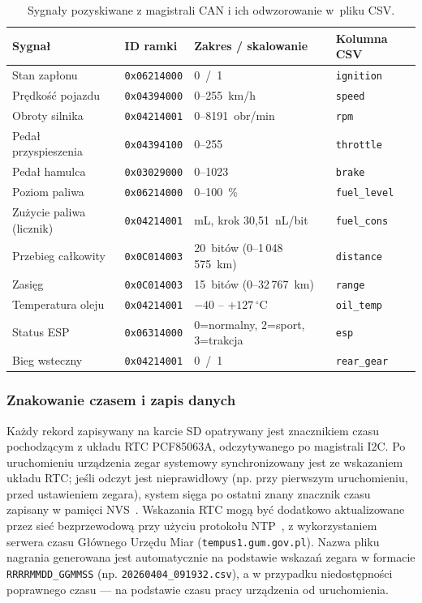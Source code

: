 \begin{table}[!h]
    \centering
    \caption{Sygnały pozyskiwane z magistrali CAN i ich odwzorowanie w~pliku CSV.}
    \label{tab:sygnaly-can}
    \begin{tabular}{| p{3.9cm} | p{2.5cm} | p{3.9cm} | p{2.2cm} |} \hline
        \textbf{Sygnał} & \textbf{ID ramki} & \textbf{Zakres / skalowanie} & \textbf{Kolumna CSV} \\ \hline\hline
        Stan zapłonu & \texttt{0x06214000} & 0~/~1 & \texttt{ignition} \\ \hline
        Prędkość pojazdu & \texttt{0x04394000} & 0--255~km/h & \texttt{speed} \\ \hline
        Obroty silnika & \texttt{0x04214001} & 0--8191~obr/min & \texttt{rpm} \\ \hline
        Pedał przyspieszenia & \texttt{0x04394100} & 0--255 & \texttt{throttle} \\ \hline
        Pedał hamulca & \texttt{0x03029000} & 0--1023 & \texttt{brake} \\ \hline
        Poziom paliwa & \texttt{0x06214000} & 0--100~\% & \texttt{fuel\_level} \\ \hline
        Zużycie paliwa (licznik) & \texttt{0x04214001} & mL, krok 30,51~nL/bit & \texttt{fuel\_cons} \\ \hline
        Przebieg całkowity & \texttt{0x0C014003} & 20~bitów (0--1\,048\,575~km) & \texttt{distance} \\ \hline
        Zasięg & \texttt{0x0C014003} & 15~bitów (0--32\,767~km) & \texttt{range} \\ \hline
        Temperatura oleju & \texttt{0x04214001} & $-40$ -- $+127\,^{\circ}$C & \texttt{oil\_temp} \\ \hline
        Status ESP & \texttt{0x06314000} & 0=normalny, 2=sport, 3=trakcja & \texttt{esp} \\ \hline
        Bieg wsteczny & \texttt{0x04214001} & 0~/~1 & \texttt{rear\_gear} \\ \hline
    \end{tabular}
\end{table}

\subsubsection{Znakowanie czasem i zapis danych}
\label{sec:zapis-danych}

Każdy rekord zapisywany na karcie SD opatrywany jest znacznikiem czasu
pochodzącym z układu RTC PCF85063A, odczytywanego po magistrali I2C. Po
uruchomieniu urządzenia zegar systemowy synchronizowany jest ze wskazaniem
układu RTC; jeśli odczyt jest nieprawidłowy (np. przy pierwszym uruchomieniu,
przed ustawieniem zegara), system sięga po ostatni znany znacznik czasu
zapisany w pamięci NVS~\cite{espidf}. Wskazania RTC mogą być dodatkowo aktualizowane przez
sieć bezprzewodową przy użyciu protokołu NTP~\cite{rfc5905}, z wykorzystaniem serwera czasu
Głównego Urzędu Miar (\texttt{tempus1.gum.gov.pl}). Nazwa pliku nagrania
generowana jest automatycznie na podstawie wskazań zegara w formacie
\texttt{RRRRMMDD\_GGMMSS} (np. \texttt{20260404\_091932.csv}), a w przypadku
niedostępności poprawnego czasu --- na podstawie czasu pracy urządzenia od
uruchomienia.


